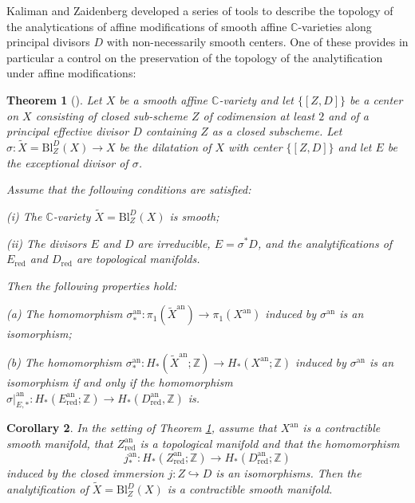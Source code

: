 \documentclass[10pt]{alggeom}
\newtheorem{thm}{Theorem}[section]
\newtheorem{cor}[thm]{Corollary}
\theoremstyle{definition}
\numberwithin{equation}{section}
\begin{document}
Kaliman and Zaidenberg \cite{KZ99} developed a series of tools to
describe the topology of the analytications of affine modifications
of smooth affine $\mathbb{C}$-varieties along principal divisors
$D$ with non-necessarily smooth centers. One of these provides in
particular a control on the preservation of the topology of the analytification
under affine modifications:
\begin{thm}[{\cite[Proposition 3.1 and Theorem 3.1]{KZ99}}]
\label{thm:Kaliman-Zaidenberg-MainThm} Let $X$ be a smooth affine
$\mathbb{C}$-variety and let $\{[Z,D]\}$ be a center on $X$ consisting
of closed sub-scheme $Z$ of codimension at least $2$ and of a principal effective
divisor $D$ containing $Z$ as a closed subscheme. Let $\sigma:\tilde{X}=\mathrm{Bl}_{Z}^{D}(X)\to X$
be the dilatation of $X$ with center $\{[Z,D]\}$ and let $E$ be
the exceptional divisor of $\sigma$. 

\noindent Assume that the following conditions are satisfied:

(i) The $\mathbb{C}$-variety $\tilde{X}=\mathrm{Bl}_{Z}^{D}(X)$
is smooth;

(ii) The divisors $E$ and $D$ are irreducible, $E=\sigma^{*}D$,
and the analytifications of $E_{\mathrm{red}}$ and $D_{\mathrm{red}}$
are topological manifolds.

\noindent Then the following properties hold:

(a) The homomorphism $\sigma_{*}^{\mathrm{an}}:\pi_{1}(\tilde{X}^{\mathrm{an}})\to\pi_{1}(X^{\mathrm{an}})$
induced by $\sigma^{\mathrm{an}}$ is an isomorphism;

(b) The homomorphism $\sigma_{*}^{\mathrm{an}}:H_{*}(\tilde{X}^{\mathrm{an}};\mathbb{Z})\to H_{*}(X^{\mathrm{an}};\mathbb{Z})$
induced by $\sigma^{\mathrm{an}}$ is an isomorphism if and only if
the homomorphism $\sigma|_{E,*}^{\mathrm{an}}:H_{*}(E_{\mathrm{red}}^{\mathrm{an}};\mathbb{Z})\to H_{*}(D_{\mathrm{red}}^{\mathrm{an}},\mathbb{Z})$
is. 
\end{thm}

\begin{cor}
\label{cor:Main-cor-Top}In the setting of Theorem \ref{thm:Kaliman-Zaidenberg-MainThm},
assume that $X^{\mathrm{an}}$ is a contractible smooth manifold,
that $Z_{\mathrm{red}}^{\mathrm{an}}$ is a topological manifold and
that the homomorphism $$j_{*}^{\mathrm{an}}:H_{*}(Z_{\mathrm{red}}^{\mathrm{an}};\mathbb{Z})\to H_{*}(D_{\mathrm{red}}^{\mathrm{an}};\mathbb{Z})$$
induced by the closed immersion $j:Z\hookrightarrow D$ is an isomorphisms. Then the analytification of $\tilde{X}=\mathrm{Bl}_{Z}^{D}(X)$ is
a contractible smooth manifold.
\end{cor}
\end{document}
